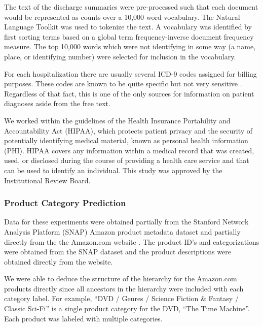 \documentclass{article}
\begin{document}
The text of the discharge summaries were pre-processed such that each
document would be represented as counts over a 10,000 word vocabulary.
The Natural Language Toolkit was used to tokenize the text. A vocabulary
was identified by first sorting terms based on a global term frequency-inverse
document frequency measure. The top 10,000 words which were not identifying
in some way (a name, place, or identifying number) were selected for
inclusion in the vocabulary.

For each hospitalization there are usually several ICD-9 codes assigned
for billing purposes. These codes are known to be quite specific but
not very sensitive \citep{Birmetal2005}. Regardless of that fact,
this is one of the only sources for information on patient diagnoses
aside from the free text. %

We worked within the guidelines of the Health Insurance Portability
and Accountability Act (HIPAA), which protects patient privacy and
the security of potentially identifying medical material, known as
personal health information (PHI). HIPAA covers any information within
a medical record that was created, used, or disclosed during the course
of providing a health care service and that can be used to identify
an individual. This study was approved by the Institutional Review
Board.


\subsubsection{Product Category Prediction}

Data for these experiments were obtained partially from the Stanford
Network Analysis Platform (SNAP) Amazon product metadata dataset \citep{SNAP}
and partially directly from the the Amazon.com website \citep{AMAZON}.
The product ID's and categorizations were obtained from the SNAP dataset
and the product descriptions were obtained directly from the website.

We were able to deduce the structure of the hierarchy for the Amazon.com
products directly since all ancestors in the hierarchy were included
with each category label. For example, {}``DVD / Genres / Science
Fiction \& Fantasy / Classic Sci-Fi'' is a single product category
for the DVD, {}``The Time Machine''. Each product was labeled with
multiple categories.
\end{document}
